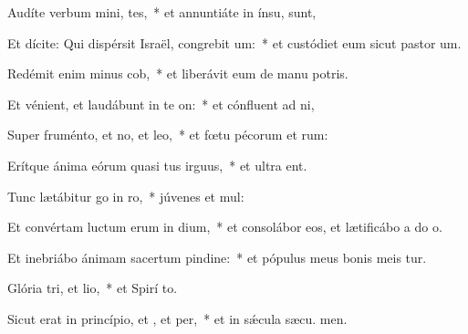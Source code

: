 \item Audíte verbum mini, tes,~* et annuntiáte in ínsu,   sunt,
\item Et dícite: Qui dispérsit Israël, congrebit um:~* et custódiet eum sicut pastor  um.
\item Redémit enim minus cob,~* et liberávit eum de manu potris.
\item Et vénient, et laudábunt in te on:~* et cónfluent ad  ni,
\item Super fruménto, et no, et leo,~* et fœtu pécorum et rum:
\item Erítque ánima eórum quasi tus irguus,~* et ultra  ent.
\item Tunc lætábitur go in ro,~* júvenes et  mul:
\item Et convértam luctum erum in dium,~* et consolábor eos, et lætificábo a do o.
\item Et inebriábo ánimam sacertum pindine:~* et pópulus meus bonis meis tur.
\item Glória tri, et lio,~* et Spirí to.
\item Sicut erat in princípio, et , et per,~* et in sǽcula sæcu. men.

